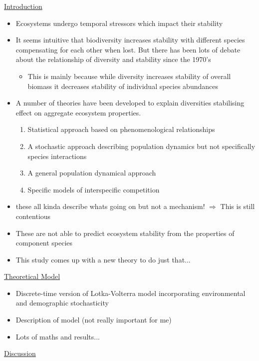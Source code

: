 \documentclass[11pt]{article}
\begin{document}
	\underline{Introduction}
	\begin{itemize}
		\item Ecosystems undergo temporal stressors which impact their stability
		\item It seems intuitive that biodiversity increases stability with different species compensating for each other when lost. But there has been lots of debate about the relationship of diversity and stability since the 1970's
		\begin{itemize}
			\item This is mainly because while diversity increases stability of overall biomass it decreases stability of individual species abundances
		\end{itemize}
		\item A number of theories have been developed to explain diversities stabilising effect on aggregate ecosystem properties.
		\begin{enumerate}
			\item Statistical approach based on phenomenological relationships
			\item A stochastic approach describing population dynamics but not specifically species interactions
			\item A general population dynamical approach
			\item Specific models of interspecific competition 
		\end{enumerate}
		\item these all kinda describe whats going on but not a mechanism! $\Rightarrow$ This is still contentious
		\item These are not able to predict ecosystem stability from the properties of component species
		\item This study comes up with a new theory to do just that...
		\end{itemize}
	\underline{Theoretical Model}
	\begin{itemize}
		\item Discrete-time version of Lotka-Volterra model incorporating environmental and demographic stochasticity
		\item Description of model (not really important for me)
		\item Lots of maths and results...  
	\end{itemize}
	\underline{Discussion}
\end{document}
